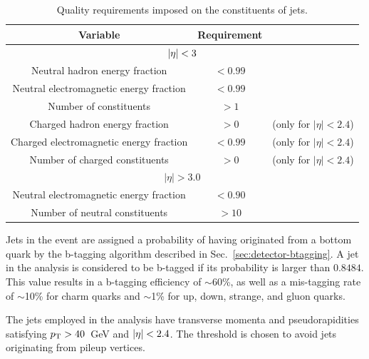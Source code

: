 
\begin{table}[ht!]
\centering
\begin{tabular}{ ccc }
Variable & Requirement & \\ \hline
\multicolumn{3}{c}{$|\eta| < 3$} \\ \hline    
Neutral hadron energy fraction & $<0.99$ &  \\
Neutral electromagnetic energy fraction & $<0.99$ &  \\
Number of constituents & $>1$ &  \\
Charged hadron energy fraction & $>0$ & (only for $|\eta| < 2.4$) \\
Charged electromagnetic energy fraction & $<0.99$ & (only for $|\eta| < 2.4$)\\
Number of charged constituents & $>0$ & (only for $|\eta| < 2.4$) \\
\hline
\multicolumn{3}{c}{$|\eta| > 3.0$} \\ \hline        
Neutral electromagnetic energy fraction & $<0.90$ &  \\
Number of neutral constituents & $>10$ &  \\
\end{tabular}
\caption{Quality requirements imposed on the constituents of jets.}
\label{tab:jet-id}
\end{table}

Jets in the event are assigned a probability of having originated from a bottom 
quark by the b-tagging %
algorithm described in Sec.~\ref{sec:detector-btagging}. A jet in the analysis 
is considered to be b-tagged if its probability is larger than $0.8484$. This 
value results in a b-tagging efficiency of $\sim$60\%, as well as a mis-tagging 
rate of $\sim$10\% for charm quarks and $\sim$1\% for up, down, strange, and 
gluon quarks.

The jets employed in the analysis have transverse momenta and pseudorapidities 
satisfying ${p_{\text T}}>40$~GeV and $|\eta|<2.4$. The \pt threshold is chosen to avoid 
jets originating from pileup vertices.

